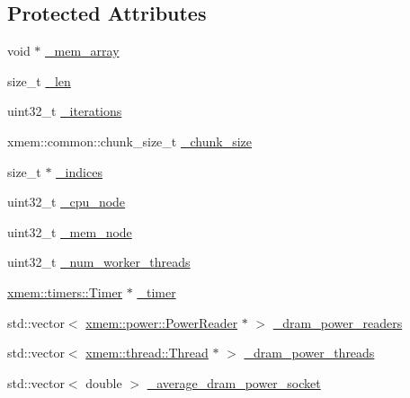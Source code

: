 \subsection*{Protected Attributes}
\begin{DoxyCompactItemize}
\item 
void $\ast$ \hyperlink{classxmem_1_1benchmark_1_1_benchmark_a134705051be06902b276f5c21d435ed0}{\+\_\+mem\+\_\+array}
\item 
size\+\_\+t \hyperlink{classxmem_1_1benchmark_1_1_benchmark_ae97857f36cabdbe76eb00142835f7881}{\+\_\+len}
\item 
uint32\+\_\+t \hyperlink{classxmem_1_1benchmark_1_1_benchmark_a968403a473a3a4f713f4e73aa0757727}{\+\_\+iterations}
\item 
xmem\+::common\+::chunk\+\_\+size\+\_\+t \hyperlink{classxmem_1_1benchmark_1_1_benchmark_ae01156a2db05a6e3f7928a7433688f56}{\+\_\+chunk\+\_\+size}
\item 
size\+\_\+t $\ast$ \hyperlink{classxmem_1_1benchmark_1_1_benchmark_a1001cb321d8d655a71d435f5a06fdd3a}{\+\_\+indices}
\item 
uint32\+\_\+t \hyperlink{classxmem_1_1benchmark_1_1_benchmark_ab840cb1f53439eeeb6bdce7cd1eed78b}{\+\_\+cpu\+\_\+node}
\item 
uint32\+\_\+t \hyperlink{classxmem_1_1benchmark_1_1_benchmark_a8489553bc6539a9b19db72e9f6ca9a9e}{\+\_\+mem\+\_\+node}
\item 
uint32\+\_\+t \hyperlink{classxmem_1_1benchmark_1_1_benchmark_acb55cafc77a1b53ea9910d1be4306970}{\+\_\+num\+\_\+worker\+\_\+threads}
\item 
\hyperlink{classxmem_1_1timers_1_1_timer}{xmem\+::timers\+::\+Timer} $\ast$ \hyperlink{classxmem_1_1benchmark_1_1_benchmark_a673c700cb58ec0bc922f36d95dab12c9}{\+\_\+timer}
\item 
std\+::vector$<$ \hyperlink{classxmem_1_1power_1_1_power_reader}{xmem\+::power\+::\+Power\+Reader} $\ast$ $>$ \hyperlink{classxmem_1_1benchmark_1_1_benchmark_a6d4445364d9b6f17ec78be6c8cf253f1}{\+\_\+dram\+\_\+power\+\_\+readers}
\item 
std\+::vector$<$ \hyperlink{classxmem_1_1thread_1_1_thread}{xmem\+::thread\+::\+Thread} $\ast$ $>$ \hyperlink{classxmem_1_1benchmark_1_1_benchmark_a7aa95682a12f8fe4262b1fffb088d6ac}{\+\_\+dram\+\_\+power\+\_\+threads}
\item 
std\+::vector$<$ double $>$ \hyperlink{classxmem_1_1benchmark_1_1_benchmark_a179b20d5ac798c140650aa82e3658273}{\+\_\+average\+\_\+dram\+\_\+power\+\_\+socket}
\item 

\end{DoxyCompactItemize}
